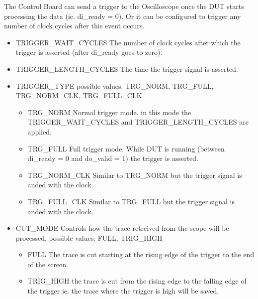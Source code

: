 The Control Board can send a trigger to the Oscilloscope once the DUT starts processing the data (ie. di\_ready = 0). Or it can be configured to trigger any number of clock cycles after this event occurs.
\begin{itemize}
 \item TRIGGER\_WAIT\_CYCLES \newline
 The number of clock cycles after which the trigger is asserted (after di\_ready goes to zero).
 \item TRIGGER\_LENGTH\_CYCLES \newline
 The time the trigger signal is asserted.
 \item TRIGGER\_TYPE \newline 
 possible values: TRG\_NORM, TRG\_FULL, TRG\_NORM\_CLK, TRG\_FULL\_CLK
        \begin{itemize}
          \item TRG\_NORM \newline Normal trigger mode. in this mode the TRIGGER\_WAIT\_CYCLES and TRIGGER\_LENGTH\_CYCLES are applied.
          \item TRG\_FULL \newline Full trigger mode. While DUT is running (between di\_ready = 0 and do\_valid = 1) the trigger is asserted.
          \item TRG\_NORM\_CLK \newline Similar to TRG\_NORM but the trigger signal is anded with the clock.
          \item TRG\_FULL\_CLK \newline Similar to TRG\_FULL but the trigger signal is anded with the clock.
       \end{itemize}

 \item CUT\_MODE \newline Controls how the trace retreived from the scope will be processed.
        possible values: FULL, TRIG\_HIGH
        \begin{itemize}
          \item FULL \newline The trace is cut starting at the rising edge of the trigger to the end of the screen.
          \item TRIG\_HIGH \newline the trace is cut from the rising edge to the falling edge of the trigger ie. the trace where the trigger is high will be saved.
        \end{itemize}
\end{itemize}  

